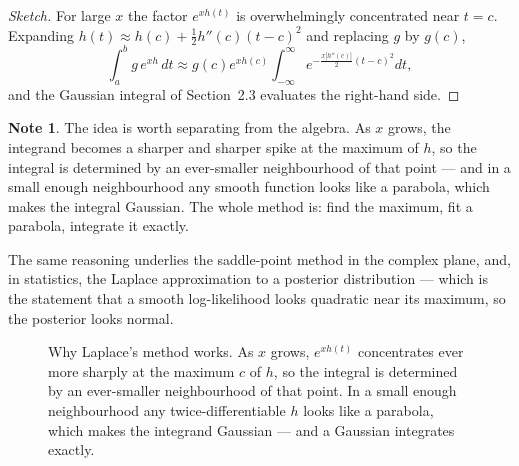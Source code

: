 \documentclass[12pt,a4paper]{report}
\theoremstyle{definition}
\newtheorem{note}[thm]{Note}
\theoremstyle{plain}
\begin{document}
\begin{proof}[Sketch]
For large $x$ the factor $e^{xh(t)}$ is overwhelmingly concentrated near $t=c$.
Expanding $h(t)\approx h(c)+\tfrac12h''(c)(t-c)^{2}$ and replacing $g$ by
$g(c)$,
$$\int^{b}_{a}g\,e^{xh}\,dt
\approx g(c)e^{xh(c)}\int^{\infty}_{-\infty}
e^{-\frac{x\left|h''(c)\right|}{2}(t-c)^{2}}dt,$$
and the Gaussian integral of Section~2.3 evaluates the right-hand side.
\end{proof}

\begin{note}
The idea is worth separating from the algebra. As $x$ grows, the integrand
becomes a sharper and sharper spike at the maximum of $h$, so the integral is
determined by an ever-smaller neighbourhood of that point --- and in a small
enough neighbourhood any smooth function looks like a parabola, which makes the
integral Gaussian. The whole method is: find the maximum, fit a parabola,
integrate it exactly.

The same reasoning underlies the saddle-point method in the complex plane, and,
in statistics, the Laplace approximation to a posterior distribution --- which
is the statement that a smooth log-likelihood looks quadratic near its maximum,
so the posterior looks normal.
\end{note}



\begin{figure}[H]
\centering
{}
\caption{Why Laplace's method works. As $x$ grows, $e^{x h(t)}$ concentrates
ever more sharply at the maximum $c$ of $h$, so the integral is determined by an
ever-smaller neighbourhood of that point. In a small enough neighbourhood any
twice-differentiable $h$ looks like a parabola, which makes the integrand
Gaussian --- and a Gaussian integrates exactly.}
\label{fig:laplacemethod}
\end{figure}
\end{document}
